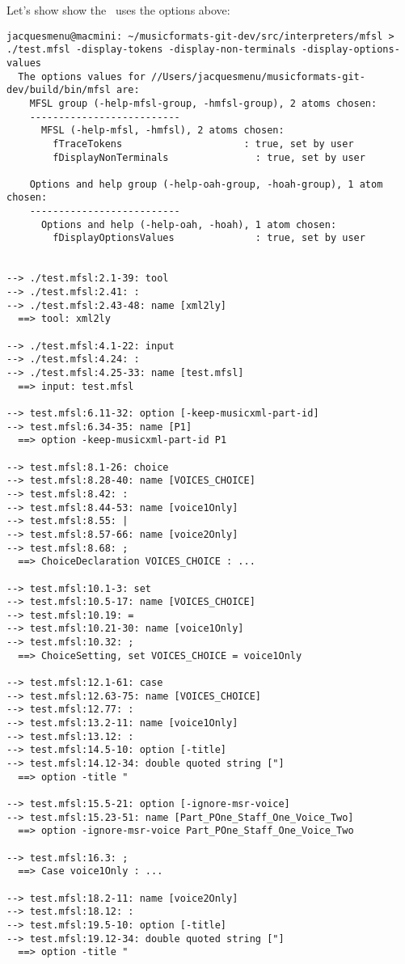 Let's show show the \mfslLangInterp\ uses the options above:
\begin{lstlisting}[language=Terminal]
jacquesmenu@macmini: ~/musicformats-git-dev/src/interpreters/mfsl > ./test.mfsl -display-tokens -display-non-terminals -display-options-values
  The options values for //Users/jacquesmenu/musicformats-git-dev/build/bin/mfsl are:
    MFSL group (-help-mfsl-group, -hmfsl-group), 2 atoms chosen:
    --------------------------
      MFSL (-help-mfsl, -hmfsl), 2 atoms chosen:
        fTraceTokens                     : true, set by user
        fDisplayNonTerminals               : true, set by user

    Options and help group (-help-oah-group, -hoah-group), 1 atom chosen:
    --------------------------
      Options and help (-help-oah, -hoah), 1 atom chosen:
        fDisplayOptionsValues              : true, set by user


--> ./test.mfsl:2.1-39: tool
--> ./test.mfsl:2.41: :
--> ./test.mfsl:2.43-48: name [xml2ly]
  ==> tool: xml2ly

--> ./test.mfsl:4.1-22: input
--> ./test.mfsl:4.24: :
--> ./test.mfsl:4.25-33: name [test.mfsl]
  ==> input: test.mfsl

--> test.mfsl:6.11-32: option [-keep-musicxml-part-id]
--> test.mfsl:6.34-35: name [P1]
  ==> option -keep-musicxml-part-id P1

--> test.mfsl:8.1-26: choice
--> test.mfsl:8.28-40: name [VOICES_CHOICE]
--> test.mfsl:8.42: :
--> test.mfsl:8.44-53: name [voice1Only]
--> test.mfsl:8.55: |
--> test.mfsl:8.57-66: name [voice2Only]
--> test.mfsl:8.68: ;
  ==> ChoiceDeclaration VOICES_CHOICE : ...

--> test.mfsl:10.1-3: set
--> test.mfsl:10.5-17: name [VOICES_CHOICE]
--> test.mfsl:10.19: =
--> test.mfsl:10.21-30: name [voice1Only]
--> test.mfsl:10.32: ;
  ==> ChoiceSetting, set VOICES_CHOICE = voice1Only

--> test.mfsl:12.1-61: case
--> test.mfsl:12.63-75: name [VOICES_CHOICE]
--> test.mfsl:12.77: :
--> test.mfsl:13.2-11: name [voice1Only]
--> test.mfsl:13.12: :
--> test.mfsl:14.5-10: option [-title]
--> test.mfsl:14.12-34: double quoted string ["]
  ==> option -title "

--> test.mfsl:15.5-21: option [-ignore-msr-voice]
--> test.mfsl:15.23-51: name [Part_POne_Staff_One_Voice_Two]
  ==> option -ignore-msr-voice Part_POne_Staff_One_Voice_Two

--> test.mfsl:16.3: ;
  ==> Case voice1Only : ...

--> test.mfsl:18.2-11: name [voice2Only]
--> test.mfsl:18.12: :
--> test.mfsl:19.5-10: option [-title]
--> test.mfsl:19.12-34: double quoted string ["]
  ==> option -title "


\end{lstlisting}
